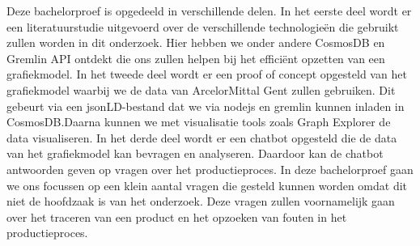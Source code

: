 Deze bachelorproef is opgedeeld in verschillende delen.
In het eerste deel wordt er een literatuurstudie uitgevoerd over de verschillende technologieën die gebruikt zullen worden in dit onderzoek.
Hier hebben we onder andere CosmosDB en Gremlin API ontdekt die ons zullen helpen bij het efficiënt opzetten van een grafiekmodel.
In het tweede deel wordt er een proof of concept opgesteld van het grafiekmodel waarbij we de data van ArcelorMittal Gent zullen gebruiken.
Dit gebeurt via een jsonLD-bestand dat we via nodejs en gremlin kunnen inladen in CosmosDB.\@ Daarna kunnen we met visualisatie tools zoals Graph Explorer de data visualiseren.
In het derde deel wordt er een chatbot opgesteld die de data van het grafiekmodel kan bevragen en analyseren. 
Daardoor kan de chatbot antwoorden geven op vragen over het productieproces.
In deze bachelorproef gaan we ons focussen op een klein aantal vragen die gesteld kunnen worden omdat dit niet de hoofdzaak is van het onderzoek.
Deze vragen zullen voornamelijk gaan over het traceren van een product en het opzoeken van fouten in het productieproces.